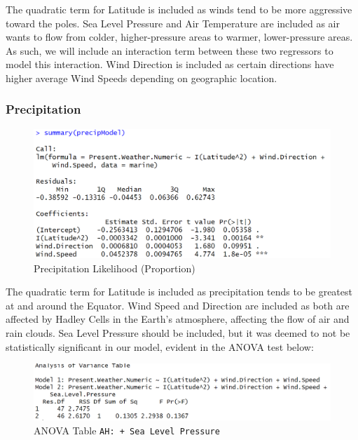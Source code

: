 \documentclass{article}
\begin{document}
The quadratic term for Latitude is included as winds tend to be more aggressive toward the poles. Sea Level Pressure and Air Temperature are included as air wants to flow from colder, higher-pressure areas to warmer, lower-pressure areas. As such, we will include an interaction term between these two regressors to model this interaction. Wind Direction is included as certain directions have higher average Wind Speeds depending on geographic location.

\subsubsection*{Precipitation}

\begin{figure}[h]
    \centering
    \includegraphics[scale = 0.6]{code snippets/summaryPrecip.PNG}
    \caption{Precipitation Likelihood (Proportion)}
    \label{fig:PrecipitationModel}
\end{figure}

The quadratic term for Latitude is included as precipitation tends to be greatest at and around the Equator. Wind Speed and Direction are included as both are affected by Hadley Cells in the Earth's atmosphere, affecting the flow of air and rain clouds. Sea Level Pressure should be included, but it was deemed to not be statistically significant in our model, evident in the ANOVA test below:

\begin{figure}[h]
    \centering
    \includegraphics[scale = 0.6]{code snippets/anovaSLPCompare.PNG}
    \caption{ANOVA Table \texttt{AH: + Sea Level Pressure}}
    \label{fig:ANOVASLPComparison}
\end{figure}
\end{document}
